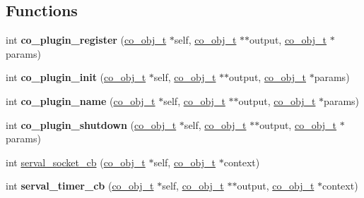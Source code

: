 \subsection*{Functions}
\begin{DoxyCompactItemize}
\item 
\hypertarget{serval-dna_8h_a3bbb939458a3edc82ae0bfe5602967df}{int {\bfseries co\-\_\-plugin\-\_\-register} (\hyperlink{structco__obj__t}{co\-\_\-obj\-\_\-t} $\ast$self, \hyperlink{structco__obj__t}{co\-\_\-obj\-\_\-t} $\ast$$\ast$output, \hyperlink{structco__obj__t}{co\-\_\-obj\-\_\-t} $\ast$params)}\label{serval-dna_8h_a3bbb939458a3edc82ae0bfe5602967df}

\item 
\hypertarget{serval-dna_8h_a0eccb03577be7f0f0e22a4d427f8773f}{int {\bfseries co\-\_\-plugin\-\_\-init} (\hyperlink{structco__obj__t}{co\-\_\-obj\-\_\-t} $\ast$self, \hyperlink{structco__obj__t}{co\-\_\-obj\-\_\-t} $\ast$$\ast$output, \hyperlink{structco__obj__t}{co\-\_\-obj\-\_\-t} $\ast$params)}\label{serval-dna_8h_a0eccb03577be7f0f0e22a4d427f8773f}

\item 
\hypertarget{serval-dna_8h_ab65e09211a66e5e4a54fcb0e963af7fe}{int {\bfseries co\-\_\-plugin\-\_\-name} (\hyperlink{structco__obj__t}{co\-\_\-obj\-\_\-t} $\ast$self, \hyperlink{structco__obj__t}{co\-\_\-obj\-\_\-t} $\ast$$\ast$output, \hyperlink{structco__obj__t}{co\-\_\-obj\-\_\-t} $\ast$params)}\label{serval-dna_8h_ab65e09211a66e5e4a54fcb0e963af7fe}

\item 
\hypertarget{serval-dna_8h_adef3d509f8db4a677d75c4bca5142d8a}{int {\bfseries co\-\_\-plugin\-\_\-shutdown} (\hyperlink{structco__obj__t}{co\-\_\-obj\-\_\-t} $\ast$self, \hyperlink{structco__obj__t}{co\-\_\-obj\-\_\-t} $\ast$$\ast$output, \hyperlink{structco__obj__t}{co\-\_\-obj\-\_\-t} $\ast$params)}\label{serval-dna_8h_adef3d509f8db4a677d75c4bca5142d8a}

\item 
int \hyperlink{serval-dna_8h_a1555be4d16034b506577764fbd2cfb5d}{serval\-\_\-socket\-\_\-cb} (\hyperlink{structco__obj__t}{co\-\_\-obj\-\_\-t} $\ast$self, \hyperlink{structco__obj__t}{co\-\_\-obj\-\_\-t} $\ast$context)
\item 
\hypertarget{serval-dna_8h_a00d4df9eabb0ac594cc118143943392f}{int {\bfseries serval\-\_\-timer\-\_\-cb} (\hyperlink{structco__obj__t}{co\-\_\-obj\-\_\-t} $\ast$self, \hyperlink{structco__obj__t}{co\-\_\-obj\-\_\-t} $\ast$$\ast$output, \hyperlink{structco__obj__t}{co\-\_\-obj\-\_\-t} $\ast$context)}\label{serval-dna_8h_a00d4df9eabb0ac594cc118143943392f}


\end{DoxyCompactItemize}
